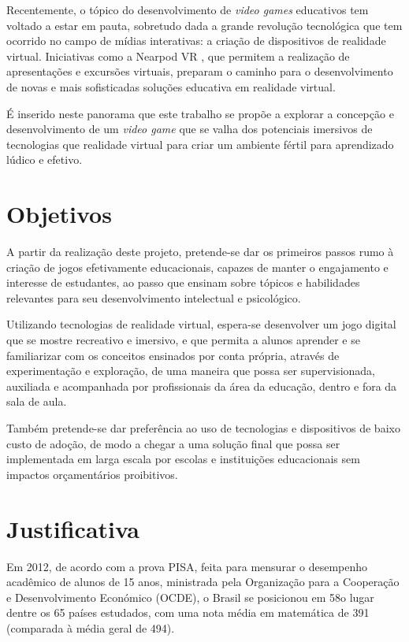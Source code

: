 Recentemente, o tópico do desenvolvimento de \textit{video games} educativos tem voltado a estar em pauta, sobretudo dada a grande revolução tecnológica que tem ocorrido no campo de mídias interativas: a criação de dispositivos de realidade virtual. Iniciativas como a Nearpod VR \cite{nearpod}, que permitem a realização de apresentações e excursões virtuais, preparam o caminho para o desenvolvimento de novas e mais sofisticadas soluções educativa em realidade virtual.

É inserido neste panorama que este trabalho se propõe a explorar a concepção e desenvolvimento de um \textit{video game} que se valha dos potenciais imersivos de tecnologias que realidade virtual para criar um ambiente fértil para aprendizado lúdico e efetivo.


\section{Objetivos}\label{sec-objetivos}

A partir da realização deste projeto, pretende-se dar os primeiros passos rumo à criação de jogos efetivamente educacionais, capazes de manter o engajamento e interesse de estudantes, ao passo que ensinam sobre tópicos e habilidades relevantes para seu desenvolvimento intelectual e psicológico.

Utilizando tecnologias de realidade virtual, espera-se desenvolver um jogo digital que se mostre recreativo e imersivo, e que permita a alunos aprender e se familiarizar com os conceitos ensinados por conta própria, através de experimentação e exploração, de uma maneira que possa ser supervisionada, auxiliada e acompanhada por profissionais da área da educação, dentro e fora da sala de aula.

Também pretende-se dar preferência ao uso de tecnologias e dispositivos de baixo custo de adoção, de modo a chegar a uma solução final  que possa ser implementada em larga escala por escolas e instituições educacionais sem impactos orçamentários proibitivos.


\section{Justificativa}\label{sec-justificativas}

Em 2012, de acordo com a prova PISA, feita para mensurar o desempenho acadêmico de alunos de 15 anos, ministrada pela Organização para a Cooperação e Desenvolvimento Económico (OCDE), o Brasil se posicionou em 58o lugar dentre os 65 países estudados, com uma nota média em matemática de 391 (comparada à média geral de 494).


